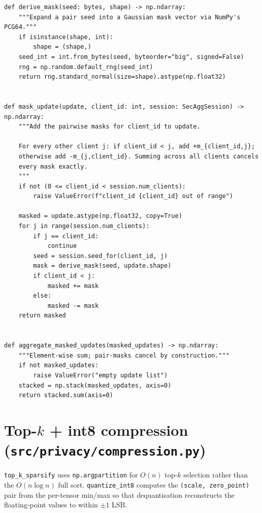 \documentclass[11pt,a4paper]{report}
\begin{document}
\begin{verbatim}
def derive_mask(seed: bytes, shape) -> np.ndarray:
    """Expand a pair seed into a Gaussian mask vector via NumPy's PCG64."""
    if isinstance(shape, int):
        shape = (shape,)
    seed_int = int.from_bytes(seed, byteorder="big", signed=False)
    rng = np.random.default_rng(seed_int)
    return rng.standard_normal(size=shape).astype(np.float32)


def mask_update(update, client_id: int, session: SecAggSession) -> np.ndarray:
    """Add the pairwise masks for client_id to update.

    For every other client j: if client_id < j, add +m_{client_id,j};
    otherwise add -m_{j,client_id}. Summing across all clients cancels
    every mask exactly.
    """
    if not (0 <= client_id < session.num_clients):
        raise ValueError(f"client_id {client_id} out of range")

    masked = update.astype(np.float32, copy=True)
    for j in range(session.num_clients):
        if j == client_id:
            continue
        seed = session.seed_for(client_id, j)
        mask = derive_mask(seed, update.shape)
        if client_id < j:
            masked += mask
        else:
            masked -= mask
    return masked


def aggregate_masked_updates(masked_updates) -> np.ndarray:
    """Element-wise sum; pair-masks cancel by construction."""
    if not masked_updates:
        raise ValueError("empty update list")
    stacked = np.stack(masked_updates, axis=0)
    return stacked.sum(axis=0)
\end{verbatim}

\section{Top-$k$ + int8 compression (\texttt{src/privacy/compression.py})}\label{lst:compress}

\texttt{top\_k\_sparsify} uses \texttt{np.argpartition} for $O(n)$
top-$k$ selection rather than the $O(n \log n)$ full sort.
\texttt{quantize\_int8} computes the
\texttt{(scale, zero\_point)} pair from the per-tensor min/max so that
dequantisation reconstructs the floating-point values to within $\pm 1$
LSB.
\end{document}

